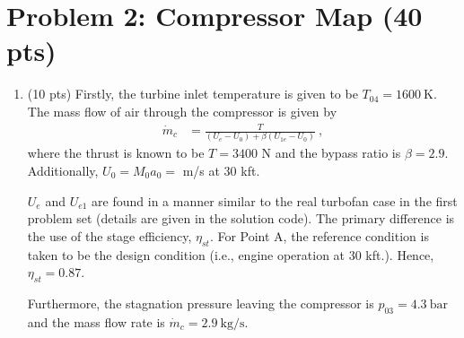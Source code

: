 \documentclass[12pt]{article}
\begin{document}
\section{Problem 2: Compressor Map (40 pts)}
\begin{enumerate}[label=(\alph*)]
	\item (10 pts)
		Firstly, the turbine inlet temperature is given to be $\boxed{T_{04}=1600\ \mathrm{K}}$. The mass flow of air through the compressor is given by 
		\begin{equation}				
			\begin{aligned}
				\dot m_c&=\frac{T}{(U_e-U_0)+\beta(U_{1e}-U_0)}\ ,
			\end{aligned}
		\end{equation}
		where the thrust is known to be $T=3400$ N and the bypass ratio is $\beta=2.9$. Additionally, $U_0=M_0a_0=$ m/s at 30 kft. 
		
		$U_e$ and $U_{e1}$ are found in a manner similar to the real turbofan case in the first problem set (details are given in the solution code). The primary difference is the use of the stage efficiency, $\eta_{st}$. For Point A, the reference condition is taken to be the design condition (i.e., engine operation at 30 kft.). Hence, $\boxed{\eta_{st}=0.87}$. 
		
		Furthermore, the stagnation pressure leaving the compressor is $\boxed{p_{03}=4.3\ \mathrm{bar}}$ and the mass flow rate is $\boxed{\dot m_c=2.9\ \mathrm{kg/s}}$.
		

\end{enumerate}
\end{document}
